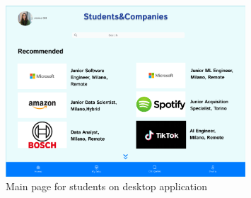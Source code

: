 \begin{figure}[ht]
    \centering
    \includegraphics[width=0.8\textwidth]{RASD-Latex/assets/UI images/mainpage_student_desktop.png}
    \caption{Main page for students on desktop application}
    \label{fig:imgae7}
\end{figure}

\clearpage